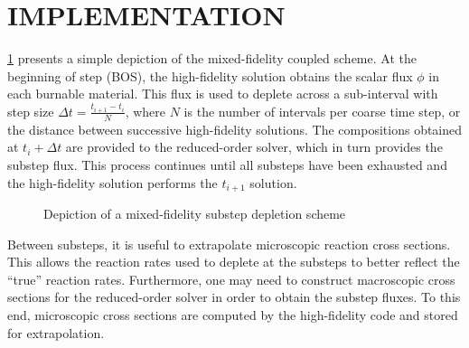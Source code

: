 \documentclass[letterpaper]{mc2021}
\begin{document}
\section{IMPLEMENTATION}

\cref{fig-substep_flow} presents a simple depiction of the mixed-fidelity coupled scheme.
At the beginning of step (BOS), the high-fidelity solution obtains the scalar
flux \( \phi \) in each burnable material.
This flux is used to deplete across a sub-interval
with step size \( \Delta t = \frac{t_{i+1} - t_i}{N} \), where \( N \) is the number
of intervals per coarse time step, or the distance between successive high-fidelity
solutions.
The compositions obtained at \( t_i + \Delta t\) are provided to the
reduced-order solver, which in turn provides the substep flux.
This process continues until all substeps have been exhausted and the high-fidelity
solution performs the \( t_{i+1} \) solution.

\begin{figure}[h]
    \centering
    \caption{Depiction of a mixed-fidelity substep depletion scheme}
    \label{fig-substep_flow}
\end{figure}

Between substeps, it is useful to extrapolate microscopic reaction cross sections.
This allows the reaction rates used to deplete at the substeps to better reflect
the ``true'' reaction rates.
Furthermore, one may need to construct macroscopic cross sections for the reduced-order
solver in order to obtain the substep fluxes.
To this end, microscopic cross sections are computed by the high-fidelity code
and stored for extrapolation.
\end{document}
